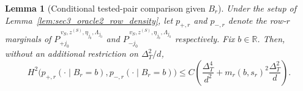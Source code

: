 \documentclass[10pt]{article}
\newtheorem{lemma}{Lemma}
\newcommand{\R}{\mathbb R}
\newcommand{\trg}{T}
\newcommand{\DeltaT}{\Delta_{\trg}}
\newcommand{\src}{S}
\newcommand{\zsrc}{z^{(\src)}}
\begin{document}
\begin{lemma}[Conditional tested-pair comparison given $B_r$]
\label{lem:sec3_oracle2_conditional_pair}
Under the setup of Lemma~\ref{lem:sec3_oracle2_row_density}, let $p_{+,r}$
and $p_{-,r}$ denote the row-$r$ marginals of
$P_{+j_0}^{\,v_{\src},\zsrc,\eta_{j_0},\Lambda_{j_0}}$ and
$P_{-j_0}^{\,v_{\src},\zsrc,\eta_{j_0},\Lambda_{j_0}}$ respectively.
Fix $b\in\R$. Then, without an additional restriction on $\DeltaT^2/d$,
\begin{equation}
\label{eq:sec3_oracle2_one_row_conditional}
    H^2\!\bigl(
        p_{+,r}(\cdot\mid B_r=b),
        p_{-,r}(\cdot\mid B_r=b)
    \bigr)
    \le
    C\left(\frac{\DeltaT^4}{d^2}+m_r(b,s_r)^2\frac{\DeltaT^2}{d}\right).
\end{equation}
\end{lemma}
\end{document}
